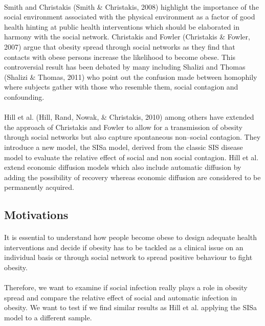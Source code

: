 \documentclass[11pt]{article}
\begin{document}
\paragraph{}
Smith and Christakis (Smith \& Christakis, 2008)  highlight the importance of the social environment associated with the physical environment as a factor of good health hinting at public health interventions which should be elaborated in harmony with the social network. Christakis and Fowler (Christakis \& Fowler, 2007) argue that obesity spread  through social networks as they find that contacts with obese persons increase the likelihood to become obese. This controversial result has been debated by many including Shalizi and Thomas (Shalizi \& Thomas, 2011) who point out the confusion made between homophily where subjects gather with those who resemble them, social contagion and confounding.

\paragraph{}
Hill et al. (Hill, Rand, Nowak, \& Christakis, 2010) among others have extended the approach of Christakis and Fowler to allow for a transmission of obesity through social networks but also capture spontaneous non--social contagion. They introduce a new model, the SISa model, derived from the classic SIS disease model to evaluate the relative effect of social and non social contagion. Hill et al. extend economic diffusion models which also include automatic diffusion by adding the possibility of recovery whereas economic diffusion are considered to be permanently acquired.

\subsection{Motivations}
\paragraph{}
It is essential to understand how people become obese to design adequate health interventions and decide if obesity has to be tackled as a clinical issue on an individual basis or through social network to spread positive behaviour to fight obesity.

\paragraph{}
Therefore, we want to examine if social infection really plays a role in obesity spread and compare the  relative effect of social and automatic infection in obesity. We want to test if we find similar results as Hill et al. applying the SISa model to a different sample.
\end{document}
